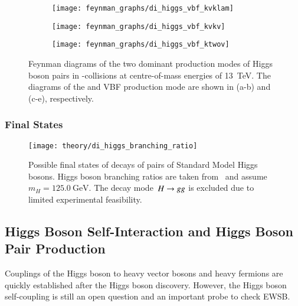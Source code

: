 \begin{figure}[htbp]
  \centering

  \begin{subfigure}{0.33\textwidth}
    \centering
    \texttt{[image: feynman\_graphs/di\_higgs\_vbf\_kvklam]}
    \subcaption{}
  \end{subfigure}\hfill%
  \begin{subfigure}{0.33\textwidth}
    \centering
    \texttt{[image: feynman\_graphs/di\_higgs\_vbf\_kvkv]}
    \subcaption{}
  \end{subfigure}\hfill%
  \begin{subfigure}{0.33\textwidth}
    \centering
    \texttt{[image: feynman\_graphs/di\_higgs\_vbf\_ktwov]}
    \subcaption{}
  \end{subfigure}

  \caption{Feynman diagrams of the two dominant production modes of Higgs boson
    pairs in \pp-collisions at centre-of-mass energies of \SI{13}{\TeV}.  The
    diagrams of the \ggF and VBF production mode are shown in (a-b) and (c-e),
    respectively.}%
  \label{fig:hh_feynmans}
\end{figure}


\subsubsection{Final States}%

\begin{figure}[htbp]
  \centering
  \texttt{[image: theory/di\_higgs\_branching\_ratio]}
  \caption{Possible final states of decays of pairs of Standard Model Higgs
    bosons. Higgs boson branching ratios are taken from~\cite{deFlorian:2016spz}
    and assume~$m_{H} = \SI{125.0}{\GeV}$. The decay mode~$H \rightarrow g g$ is
    excluded due to limited experimental feasibility.}
  \label{fig:hh_branching_ratios}
\end{figure}



\clearpage
{}


\subsection{Higgs Boson Self-Interaction and Higgs Boson Pair Production}

Couplings of the Higgs boson to heavy vector bosons and heavy fermions
are quickly established after the Higgs boson discovery. However, the
Higgs boson self-coupling is still an open question and an important
probe to check EWSB.

